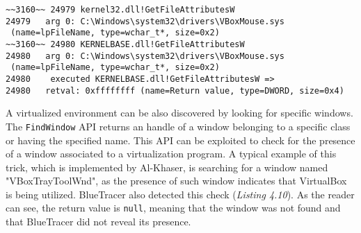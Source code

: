 \vspace{1cm}
\begin{lstlisting}[caption={ Log portion relative to the search for \texttt{VboxMouse.sys} search},captionpos=b]
~~3160~~ 24979 kernel32.dll!GetFileAttributesW
24979 	arg 0: C:\Windows\system32\drivers\VBoxMouse.sys
 (name=lpFileName, type=wchar_t*, size=0x2)
~~3160~~ 24980 KERNELBASE.dll!GetFileAttributesW
24980 	arg 0: C:\Windows\system32\drivers\VBoxMouse.sys
 (name=lpFileName, type=wchar_t*, size=0x2)
24980    executed KERNELBASE.dll!GetFileAttributesW =>
24980 	retval: 0xffffffff (name=Return value, type=DWORD, size=0x4)
\end{lstlisting}

\iffalse
-Registry Artifacts
-File system artifacts -> Virtual Devices here?
-Window
-DLLs
\fi

A virtualized environment can be also discovered by looking for specific windows. The \texttt{FindWindow} API returns an handle of a window belonging to a specific class or having the specified name. This API can be exploited to check for the presence of a window associated to a virtualization program. A typical example of this trick, which is implemented by Al-Khaser, is searching for a window named "VBoxTrayToolWnd", as the presence of such window indicates that VirtualBox is being utilized. BlueTracer also detected this check (\textit{Listing 4.10}). As the reader can see, the return value is \texttt{null}, meaning that the window was not found and that BlueTracer did not reveal its presence.

